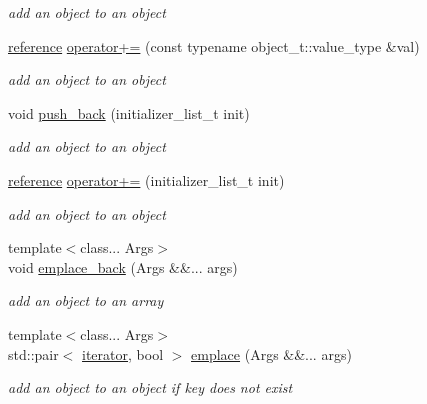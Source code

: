 \begin{DoxyCompactItemize}
\begin{DoxyCompactList}\small\item\em add an object to an object \end{DoxyCompactList}\item 
\mbox{\hyperlink{classnlohmann_1_1basic__json_ac6a5eddd156c776ac75ff54cfe54a5bc}{reference}} \mbox{\hyperlink{classnlohmann_1_1basic__json_abf04978d85a2d5c4754f4806d42f46fd}{operator+=}} (const typename object\+\_\+t\+::value\+\_\+type \&val)
\begin{DoxyCompactList}\small\item\em add an object to an object \end{DoxyCompactList}\item 
void \mbox{\hyperlink{classnlohmann_1_1basic__json_a1be31ef2d2934d37a818083a4af44f99}{push\+\_\+back}} (initializer\+\_\+list\+\_\+t init)
\begin{DoxyCompactList}\small\item\em add an object to an object \end{DoxyCompactList}\item 
\mbox{\hyperlink{classnlohmann_1_1basic__json_ac6a5eddd156c776ac75ff54cfe54a5bc}{reference}} \mbox{\hyperlink{classnlohmann_1_1basic__json_af245c2b6714d76ed99a2d02f2596d596}{operator+=}} (initializer\+\_\+list\+\_\+t init)
\begin{DoxyCompactList}\small\item\em add an object to an object \end{DoxyCompactList}\item 
{\footnotesize template$<$class... Args$>$ }\\void \mbox{\hyperlink{classnlohmann_1_1basic__json_aacf5eed15a8b66fb1e88910707a5e229}{emplace\+\_\+back}} (Args \&\&... args)
\begin{DoxyCompactList}\small\item\em add an object to an array \end{DoxyCompactList}\item 
{\footnotesize template$<$class... Args$>$ }\\std\+::pair$<$ \mbox{\hyperlink{classnlohmann_1_1basic__json_a099316232c76c034030a38faa6e34dca}{iterator}}, bool $>$ \mbox{\hyperlink{classnlohmann_1_1basic__json_a5338e282d1d02bed389d852dd670d98d}{emplace}} (Args \&\&... args)
\begin{DoxyCompactList}\small\item\em add an object to an object if key does not exist \end{DoxyCompactList}\item 

\end{DoxyCompactItemize}
